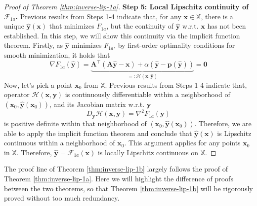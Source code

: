 \documentclass{amsart} %
\def\vzero{{\bm{0}}}
\def\vp{{\bm{p}}}
\def\vx{{\bm{x}}}
\def\vy{{\bm{y}}}
\def\mA{{\bm{A}}}
\def\sX{{\mathbb{X}}}
\def\cF{{\mathcal{F}}}
\def\cH{{\mathcal{H}}}
\theoremstyle{definition}
\theoremstyle{remark}
\begin{document}
\begin{proof}[Proof of Theorem \ref{thm:inverse-lip-1a}]
\textbf{Step 5: Local Lipschitz continuity of $\cF_{1a}$.} Previous results from Steps 1-4 indicate that, for any $\vx \in \sX$, there is a unique $\hat{\vy}(\vx)$ that minimizes $F_{1a}$, but the continuity of $\hat{\vy}$ w.r.t. $\vx$ has not been established. In this step, we will show this continuity via the implicit function theorem.
Firstly, as $\hat{\vy}$ minimizes $F_{1a}$, by first-order optimality conditions for smooth minimization, it holds that
\[ \nabla F_{1a}(\hat{\vy}) = \underbrace{\mA^\top(\mA\hat{\vy}-\vx) + \alpha ( \hat{\vy} - \vp(\hat{\vy}) )}_{=:\cH(\vx,\hat{\vy})}  = \vzero \]
Now, let's pick a point $\vx_0$ from $\sX$. Previous results from Steps 1-4 indicate that, operator $\cH(\vx,\vy)$ is continuously differentiable within a neighborhood of $(\vx_0,\hat{\vy}(\vx_0))$, and its Jacobian matrix w.r.t. $\vy$
\[D_{\vy}\cH(\vx,\vy) = \nabla^2 F_{1a}(\vy)\]
is positive definite within that neighborhood of $(\vx_0,\hat{\vy}(\vx_0))$. Therefore, we are able to apply the implicit function theorem \cite[Theorem 3.9]{Folland2023-AdvCalcPDF} and conclude that $\hat{\vy}(\vx)$ is Lipschitz continuous within a neighborhood of $\vx_0$. This argument applies for any points $\vx_0$ in $\sX$. Therefore, $\hat{\vy}=\cF_{1a}(\vx)$ is locally Lipschitz continuous on $\sX$.
\end{proof}

The proof line of Theorem \ref{thm:inverse-lip-1b} largely follows the proof of Theorem \ref{thm:inverse-lip-1a}. Here we will highlight the difference of proofs between the two theorems, so that Theorem \ref{thm:inverse-lip-1b} will be rigorously proved without too much redundancy.
\end{document}
